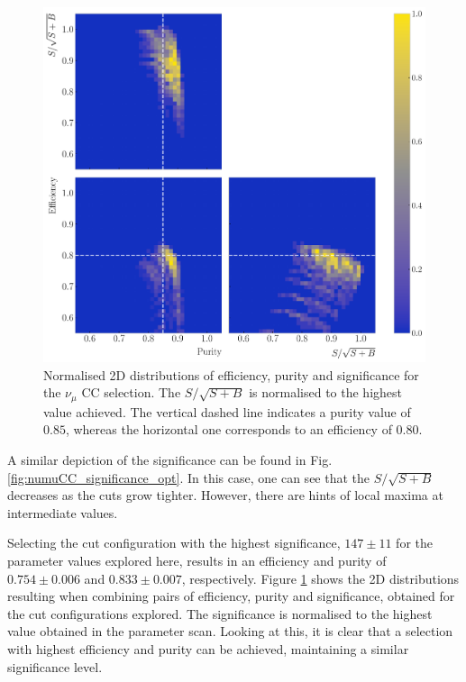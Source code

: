 \begin{figure}[t]
    \centering
    \includegraphics[width=.95\linewidth]{Images/GAr_selection/numuCC_metric_heatmap.pdf}
    \caption{Normalised 2D distributions of efficiency, purity and significance for the $\nu_{\mu}$ CC selection. The $S/\sqrt{S+B}$ is normalised to the highest value achieved. The vertical dashed line indicates a purity value of $0.85$, whereas the horizontal one corresponds to an efficiency of $0.80$.}
    \label{fig:numuCC_metric_heat}
\end{figure}

A similar depiction of the significance can be found in Fig. \ref{fig:numuCC_significance_opt}. In this case, one can see that the $S/\sqrt{S+B}$ decreases as the cuts grow tighter. However, there are hints of local maxima at intermediate values.

Selecting the cut configuration with the highest significance, $147 \pm 11$ for the parameter values explored here, results in an efficiency and purity of $0.754 \pm 0.006$ and $0.833 \pm 0.007$, respectively. Figure \ref{fig:numuCC_metric_heat} shows the 2D distributions resulting when combining pairs of efficiency, purity and significance, obtained for the cut configurations explored. The significance is normalised to the highest value obtained in the parameter scan. Looking at this, it is clear that a selection with highest efficiency and purity can be achieved, maintaining a similar significance level.

